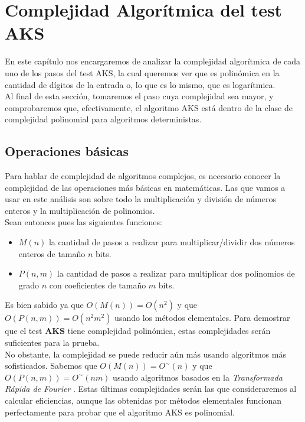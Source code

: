 \chapter{Complejidad Algorítmica del test AKS}

En este capítulo nos encargaremos de analizar la complejidad algorítmica de cada uno de los pasos del test AKS, la cual queremos ver que es polinómica en la cantidad de dígitos de la entrada o, lo que es lo mismo, que es logarítmica.\\

Al final de esta sección, tomaremos el paso cuya complejidad sea mayor, y comprobaremos que, efectivamente, el algoritmo AKS está dentro de la clase de complejidad polinomial para algoritmos deterministas.

\section{Operaciones básicas}

Para hablar de complejidad de algoritmos complejos, es necesario conocer la complejidad de las operaciones más básicas en matemáticas. Las que vamos a usar en este análisis son sobre todo la multiplicación y división de números enteros y la multiplicación de polinomios.\\

Sean entonces pues las siguientes funciones:\\

\begin{itemize}
	\item $M(n)$ la cantidad de pasos a realizar para multiplicar/dividir dos números enteros de tamaño $n$ bits.
	
	\item $P(n, m)$ la cantidad de pasos a realizar para multiplicar dos polinomios de grado $n$ con coeficientes de tamaño $m$ bits.
\end{itemize}

Es bien sabido ya que $O(M(n)) = O(n^2)$ y que $O(P(n, m)) = O(n^2m^2)$ usando los métodos elementales. Para demostrar que el test \textbf{AKS} tiene complejidad polinómica, estas complejidades serán suficientes para la prueba.\\

No obstante, la complejidad se puede reducir aún más usando algoritmos más sofisticados. Sabemos que $O(M(n)) = O^\sim(n)$ y que $O(P(n, m)) = O^\sim(nm)$ usando algoritmos basados en la \textit{Transformada Rápida de Fourier} \cite{modern_computer_algebra}. Estas últimas complejidades serán las que consideraremos al calcular eficiencias, aunque las obtenidas por métodos elementales funcionan perfectamente para probar que el algoritmo AKS es polinomial.


